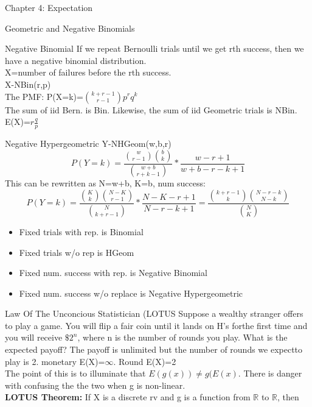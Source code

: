 \documentclass[a4paper, 12pt]{article}
\begin{document}
\begin{section}{Chapter 4: Expectation}
\begin{subsection}{Geometric and Negative Binomials}
\end{subsection}
\begin{subsection}{Negative Binomial}
If we repeat Bernoulli trials until we get rth success, then we have a negative binomial distribution.\\
X=number of failures before the rth success.\\
X-NBin(r,p)\\
The PMF: P(X=k)=${k+r-1 \choose r-1}p^{r}q^{k}$\\
The sum of iid Bern. is Bin. Likewise, the sum of iid 
Geometric trials is NBin.\\
E(X)=$r\frac{q}{p}$
\end{subsection}
\begin{subsection}{Negative Hypergeometric}
Y-NHGeom(w,b,r)\\
\begin{equation} 
P(Y=k)=\frac{{w \choose r-1}{b \choose k}}{{w+b \choose r+k-1}}*\frac{w-r+1}{w+b-r-k+1}
\end{equation}
This can be rewritten as N=w+b, K=b, num success:
\begin{equation} 
P(Y=k)=\frac{{K \choose k}{N-K \choose r-1}}{{N \choose k+r-1}}*\frac{N-K-r+1}{N-r-k+1}=
\frac{{k+r-1 \choose k}{N-r-k \choose N-k}}{{N \choose K}}
\end{equation}
\begin{itemize}
\item{Fixed trials with rep. is Binomial}
\item{Fixed trials w/o rep is HGeom}
\item{Fixed num. success with rep. is Negative Binomial}
\item{Fixed num. success w/o replace is Negative Hypergeometric}
\end{itemize}
\end{subsection}
\begin{subsection}{Law Of The Unconcious Statistician (LOTUS}
Suppose a wealthy stranger offers to play a game. You will flip a fair coin until it lands on H's forthe first time and you will receive $\$2^{n}$, where n is the number of rounds you play. What is the expected payoff? 
The payoff is unlimited but the number of rounds we expectto play is 2. monetary E(X)=$\infty$. Round E(X)=2 \\
The point of this is to illuminate that $E(g(x))\neq g(E(x)$. There is danger with confusing the the two when g is non-linear.\\
\textbf{LOTUS Theorem:} If X is a discrete rv and g is a function from $\mathbb{R}$ to $\mathbb{R}$, then

\end{subsection}
\end{section}
\end{document}
